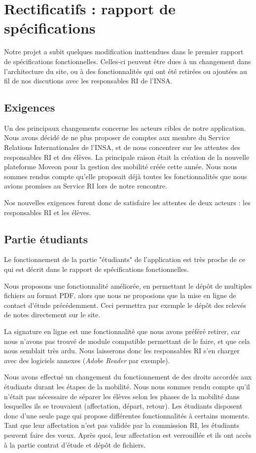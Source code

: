 \chapter{Rectificatifs : rapport de spécifications}

Notre projet a subit quelques modification inattendues dans le premier rapport de spécifications fonctionnelles.  Celles-ci peuvent être dues à un changement dans l'architecture du site, ou à des fonctionnalités qui ont été retirées ou ajoutées au fil de nos discutions avec les responsables RI de l'INSA.

\section{Exigences}
Un des principaux changements concerne les acteurs cibles de notre application. Nous avons décidé de ne plus proposer de comptes aux membre du Service Relations Internationales de l'INSA, et de nous concentrer sur les attentes des responsables RI et des élèves. La principale raison était la création de la nouvelle plateforme Moveon pour la gestion des mobilité créée cette année. Nous nous sommes rendus compte qu'elle proposait déjà toutes les fonctionnalités que nous avions promises au Service RI lors de notre rencontre.

Nos nouvelles exigences furent donc de satisfaire les attentes de deux acteurs : les responsables RI et les élèves.

\section{Partie étudiants}
Le fonctionnement de la partie "étudiants" de l'application est très proche de ce qui est décrit dans le rapport de spécifications fonctionnelles.

 Nous proposons une fonctionnalité améliorée, en permettant le dépôt de multiples fichiers au format PDF, alors que nous ne proposions que la mise en ligne de contact d'étude précédemment. Ceci permettra par exemple le dépôt des relevés de notes directement sur le site.

La signature en ligne est une fonctionnalité que nous avons préféré retirer, car nous n'avons pas trouvé de module compatible permettant de le faire, et que cela nous semblait très ardu. Nous laisserons donc les responsables RI s'en charger avec des logiciels annexes (\textit{Adobe Reader} par exemple).
\smallbreak

Nous avons effectué un changement du fonctionnement de des droits accordés aux étudiants durant les étapes de la mobilité. Nous nous sommes rendu compte qu'il n'était pas nécessaire de séparer les élèves selon les phases de la mobilité dans lesquelles ils se trouvaient (affectation, départ, retour). Les étudiants disposent donc d'une seule page qui propose différentes fonctionnalités à certains moments. Tant que leur affectation n'est pas validée par la commission RI, les étudiants peuvent faire des vœux. Après quoi, leur affectation est verrouillée et ils ont accès à la partie contrat d'étude et dépôt de fichiers.
\smallbreak

